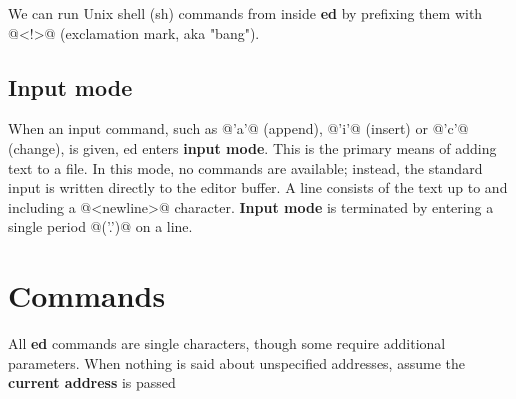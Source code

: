 \documentclass[a4paper,10pt]{article}
\begin{document}
We can run Unix shell (sh) commands from inside \textbf{ed} by prefixing them with @<!>@ (exclamation mark, aka "bang").

\subsection{Input mode}\label{sec:input}

When an input command, such as @'a'@ (append), @'i'@ (insert) or @'c'@
(change), is given, ed enters \textbf{input mode}. This is the primary means of adding
text to a file. In this mode, no commands are available; instead, the standard
input is written directly to the editor buffer. A line consists of the text up
to and including a @<newline>@ character. \textbf{Input mode} is terminated by entering a
single period @('.')@ on a line.

\section{Commands}

All \textbf{ed} commands are single characters, though some require additional
parameters. When nothing is said about unspecified addresses, assume the
\textbf{current address} is passed
\end{document}
